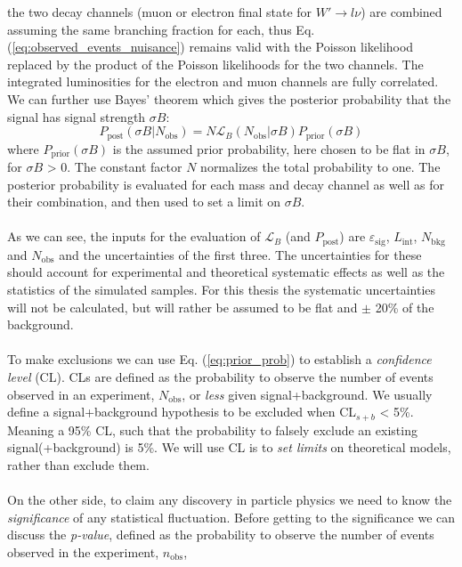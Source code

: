 \documentclass[12pt, a4paper]{book}
\begin{document}
the two decay channels (muon or electron final state for $W'\rightarrow l\nu$) are combined assuming the same branching fraction for each, thus Eq. (\ref{eq:observed_events_nuisance}) remains valid with the Poisson likelihood replaced by the product of the Poisson likelihoods for the two channels. 
The integrated luminosities for the electron and muon channels are fully correlated. We can further use Bayes' theorem which gives the posterior probability that the signal has signal strength $\sigma B$:
\begin{equation}\label{eq:prior_prob}
    P_{\text{post}}(\sigma B\vert N_{\text{obs}}) = N \mathcal{L}_B (N_{\text{obs}}\vert\sigma B) P_{\text{prior}}(\sigma B)
\end{equation}
where $P_{\text{prior}}(\sigma B)$ is the assumed prior probability, here chosen to be flat in $\sigma B$, for $\sigma B$ > 0. The constant factor $N$ normalizes the total probability to one. The posterior probability is evaluated for each mass and decay channel as well as for their 
combination, and then used to set a limit on $\sigma B$.\\
\\As we can see, the inputs for the evaluation of $\mathcal{L}_B$ (and $P_{\text{post}}$) are $\varepsilon_{\text{sig}}$, $L_{\text{int}}$, $N_{\text{bkg}}$ and $N_{\text{obs}}$ and the uncertainties of the first three. The uncertainties for these should account for experimental 
and theoretical systematic effects as well as the statistics of the simulated samples. For this thesis the systematic uncertainties will not be calculated, but will rather be assumed to be flat and $\pm$ 20\% of the background.\\
\\To make exclusions we can use Eq. (\ref{eq:prior_prob}) to establish a \textit{confidence level} (CL). CLs are defined as the probability to observe the number of events observed in an experiment, $N_{\text{obs}}$, or \textit{less} given signal+background. We usually define a signal+background 
hypothesis to be excluded when CL$_{s+b}$ < 5\%. Meaning a 95\% CL, such that the probability to falsely exclude an existing signal(+background) is 5\%. We will use CL is to \textit{set limits} on theoretical models, rather than exclude them.\\
\\On the other side, to claim any discovery in particle physics we need to know the \textit{significance} of any statistical fluctuation. Before getting to the significance we can discuss the \textit{p-value}, defined as the probability to observe the number of events observed in the experiment, $n_{\text{obs}}$, 
\end{document}
